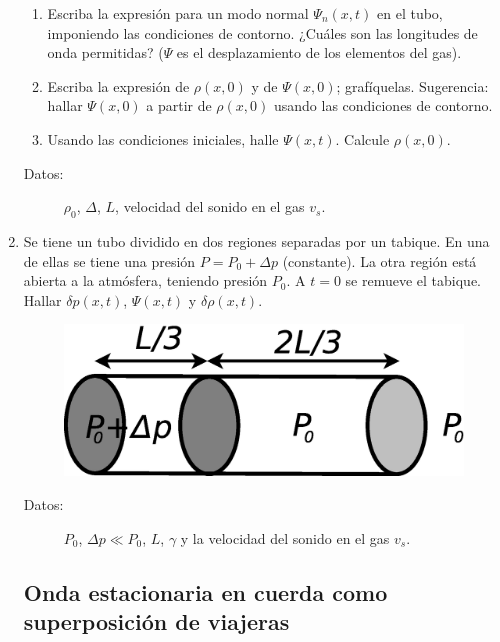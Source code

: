 \documentclass[11pt,spanish,a4paper]{article}
\begin{document}
\begin{enumerate}
\begin{enumerate}
\item Escriba la expresión para un modo normal $\Psi_{n}(x,t)$ en el tubo,
imponiendo las condiciones de contorno. ¿Cuáles son las longitudes
de onda permitidas? ($\Psi$ es el desplazamiento de los elementos
del gas). 
\item Escriba la expresión de $\rho(x,0)$ y de $\Psi(x,0)$; grafíquelas.
Sugerencia: hallar $\Psi(x,0)$ a partir de $\rho(x,0)$ usando las
condiciones de contorno. 
\item Usando las condiciones iniciales, halle $\Psi(x,t)$. Calcule $\rho(x,0)$. \end{enumerate}
\begin{description}
\item [{Datos:}] $\rho_{0}$, $\Delta$, $L$, velocidad del sonido en
el gas $v_{s}$.
\end{description}
\item Se tiene un tubo dividido en dos regiones separadas por un tabique.
En una de ellas se tiene una presión $P=P_{0}+\Delta p$ (constante).
La otra región está abierta a la atmósfera, teniendo presión $P_{0}$.
A $t=0$ se remueve el tabique. Hallar $\delta p(x,t)$, $\Psi(x,t)$
y $\delta\rho(x,t)$.
\begin{figure}[H]
\centering{}\includegraphics[clip,scale=0.25]{ej1-31}
\end{figure}
\begin{description}
\item [{Datos:}] $P_{0}$, $\Delta p\ll P_{0}$, $L$, $\gamma$ y la velocidad
del sonido en el gas $v_{s}$.
\end{description}


\subsection*{Onda estacionaria en cuerda como superposición de viajeras}



\end{enumerate}
\end{document}
